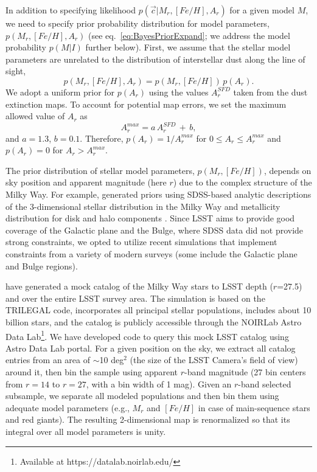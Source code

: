 In addition to specifying likelihood $p(\vec{c}|M_r, [Fe/H], A_r)$ for a given model $M$, we need to specify
prior probability distribution for model parameters, $p(M_r, [Fe/H],A_r)$ (see eq.~\ref{eq:BayesPriorExpand};
we address the model probability $p(M|I)$ further below). First, we assume that the stellar model parameters
are unrelated to the distribution of interstellar dust along the line of sight,
\begin{equation}
 \label{eq:BayesPrior2}
               p(M_r, [Fe/H],A_r) = p(M_r, [Fe/H]) \, p(A_r).
\end{equation}
We adopt a uniform prior for $p(A_r)$ using the values $A_r^{SFD}$ taken from the \cite{schlegel_maps_1998}
dust extinction maps. To account for potential map errors, we set the maximum allowed value of $A_r$ as
\begin{equation}
          A_r^{max} =  a \, A_r^{SFD} \, + \, b,
\end{equation}
and $a=1.3$, $b=0.1$. Therefore, $p(A_r) = 1/A_r^{max}$ for $0 \le A_r \le A_r^{max}$ and $p(A_r) = 0$ for $A_r > A_r^{max}$.

The prior distribution of stellar model parameters, $p(M_r, [Fe/H])$, depends on sky position and apparent
magnitude (here $r$) due to the complex structure of the Milky Way. For example,  \cite{2014ApJ...783..114G}
generated priors using SDSS-based analytic descriptions of the 3-dimensional stellar distribution in the Milky Way
\citep{2008ApJ...673..864J} and metallicity distribution for disk and halo components \citep{2008ApJ...684..287I}. 
Since LSST aims to provide good coverage of the Galactic plane and the Bulge, where SDSS data did not provide strong
constraints, we opted to utilize recent simulations that implement constraints from a variety of modern surveys (some
include the Galactic plane and Bulge regions). 

\cite{dal_tio_simulating_2022} have generated a mock catalog of the Milky Way stars to LSST depth ($r$=27.5) and over
the entire LSST survey area. The simulation is based on the TRILEGAL code, incorporates all principal stellar populations,
includes about 10 billion stars, and the catalog is publicly accessible through the NOIRLab Astro Data
Lab\footnote{Available at https://datalab.noirlab.edu/}.
We have developed code to query this mock LSST catalog using Astro Data Lab portal. For a given position on the sky, we
extract all catalog entries from an area of $\sim$10 deg$^2$ (the size of the LSST Camera's field of view) around it, then bin
the sample using apparent $r$-band magnitude (27 bin centers from $r=14$ to $r=27$, with a bin width of 1 mag). 
Given an $r$-band selected subsample, we separate all modeled populations and then bin them using adequate model
parameters (e.g., $M_r$ and $[Fe/H]$ in case of main-sequence stars and red giants). The resulting 2-dimensional map
is renormalized so that its integral over all model parameters is unity.

